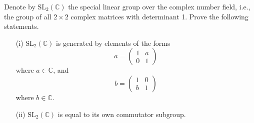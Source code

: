 \documentclass[openany]{book}
\begin{document}
\begin{prob}
    Denote by \( \text{SL}_2(\mathbb{C}) \) the special linear group over the complex number field, i.e., the group of all \( 2 \times 2 \) complex matrices with determinant 1. Prove the following statements.

    \begin{enumerate}
        \item[(i)] \( \text{SL}_2(\mathbb{C}) \) is generated by elements of the forms
        \[
        a=\begin{pmatrix}
        1 & a \\
        0 & 1 
        \end{pmatrix}
        \]
        where \( a \in \mathbb{C} \), and
        \[
        b=\begin{pmatrix}
        1 & 0 \\
        b & 1 
        \end{pmatrix}
        \]
        where \( b \in \mathbb{C} \).
        
        \item[(ii)] \( \text{SL}_2(\mathbb{C}) \) is equal to its own commutator subgroup.
    \end{enumerate}
\end{prob}
\end{document}
